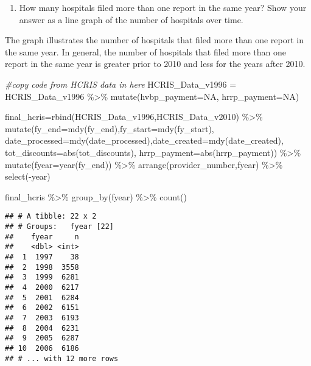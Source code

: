 \documentclass[
]{article}
\newenvironment{Shaded}{\begin{snugshade}}{\end{snugshade}}
\newcommand{\AttributeTok}[1]{\textcolor[rgb]{0.77,0.63,0.00}{#1}}
\newcommand{\CommentTok}[1]{\textcolor[rgb]{0.56,0.35,0.01}{\textit{#1}}}
\newcommand{\ConstantTok}[1]{\textcolor[rgb]{0.00,0.00,0.00}{#1}}
\newcommand{\FunctionTok}[1]{\textcolor[rgb]{0.00,0.00,0.00}{#1}}
\newcommand{\NormalTok}[1]{#1}
\newcommand{\OtherTok}[1]{\textcolor[rgb]{0.56,0.35,0.01}{#1}}
\newcommand{\SpecialCharTok}[1]{\textcolor[rgb]{0.00,0.00,0.00}{#1}}
\providecommand{\tightlist}{%
  \setlength{\itemsep}{0pt}\setlength{\parskip}{0pt}}
\begin{document}
\begin{enumerate}
\def\labelenumi{\arabic{enumi}.}
\setcounter{enumi}{1}
\tightlist
\item
  How many hospitals filed more than one report in the same year? Show
  your answer as a line graph of the number of hospitals over time.
\end{enumerate}

The graph illustrates the number of hospitals that filed more than one
report in the same year. In general, the number of hospitals that filed
more than one report in the same year is greater prior to 2010 and less
for the years after 2010.

\begin{Shaded}
\begin{Highlighting}[]
\CommentTok{\#copy code from HCRIS data in here}
\NormalTok{HCRIS\_Data\_v1996 }\OtherTok{=}\NormalTok{ HCRIS\_Data\_v1996 }\SpecialCharTok{\%\textgreater{}\%}
  \FunctionTok{mutate}\NormalTok{(}\AttributeTok{hvbp\_payment=}\ConstantTok{NA}\NormalTok{, }\AttributeTok{hrrp\_payment=}\ConstantTok{NA}\NormalTok{)}

\NormalTok{final\_hcris}\OtherTok{=}\FunctionTok{rbind}\NormalTok{(HCRIS\_Data\_v1996,HCRIS\_Data\_v2010) }\SpecialCharTok{\%\textgreater{}\%}
  \FunctionTok{mutate}\NormalTok{(}\AttributeTok{fy\_end=}\FunctionTok{mdy}\NormalTok{(fy\_end),}\AttributeTok{fy\_start=}\FunctionTok{mdy}\NormalTok{(fy\_start),}
         \AttributeTok{date\_processed=}\FunctionTok{mdy}\NormalTok{(date\_processed),}\AttributeTok{date\_created=}\FunctionTok{mdy}\NormalTok{(date\_created),}
         \AttributeTok{tot\_discounts=}\FunctionTok{abs}\NormalTok{(tot\_discounts), }\AttributeTok{hrrp\_payment=}\FunctionTok{abs}\NormalTok{(hrrp\_payment)) }\SpecialCharTok{\%\textgreater{}\%}
  \FunctionTok{mutate}\NormalTok{(}\AttributeTok{fyear=}\FunctionTok{year}\NormalTok{(fy\_end)) }\SpecialCharTok{\%\textgreater{}\%}
  \FunctionTok{arrange}\NormalTok{(provider\_number,fyear) }\SpecialCharTok{\%\textgreater{}\%}
  \FunctionTok{select}\NormalTok{(}\SpecialCharTok{{-}}\NormalTok{year)}

\NormalTok{final\_hcris }\SpecialCharTok{\%\textgreater{}\%} \FunctionTok{group\_by}\NormalTok{(fyear) }\SpecialCharTok{\%\textgreater{}\%} \FunctionTok{count}\NormalTok{()}
\end{Highlighting}
\end{Shaded}

\begin{verbatim}
## # A tibble: 22 x 2
## # Groups:   fyear [22]
##    fyear     n
##    <dbl> <int>
##  1  1997    38
##  2  1998  3558
##  3  1999  6281
##  4  2000  6217
##  5  2001  6284
##  6  2002  6151
##  7  2003  6193
##  8  2004  6231
##  9  2005  6287
## 10  2006  6186
## # ... with 12 more rows
\end{verbatim}
\end{document}
